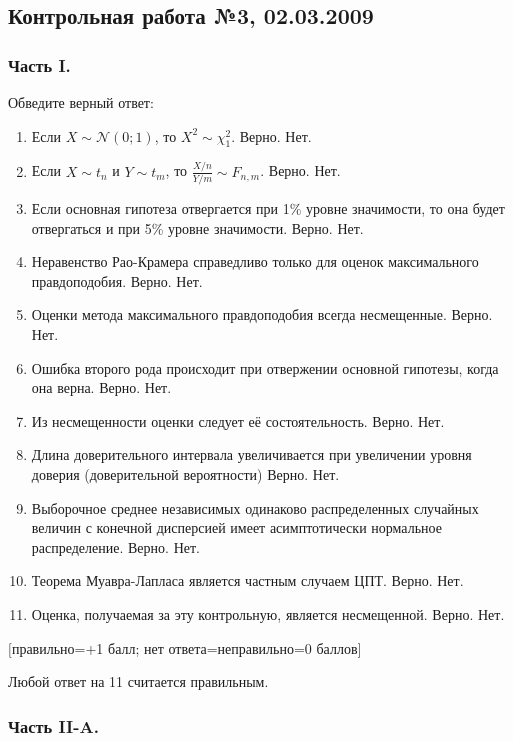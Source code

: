 \documentclass[12pt, a4paper]{article}\usepackage[]{graphicx}\usepackage[]{color}
\begin{document}
\subsection{Контрольная работа №3, 02.03.2009}

\subsubsection*{Часть I.}

Обведите верный ответ:

\begin{enumerate}
\item Если $X\sim \mathcal{N}(0;1)$, то $X^{2}\sim \chi^{2}_{1}$. Верно. Нет.
\item Если $X\sim t_{n}$ и $Y\sim t_{m}$, то $\frac{X/n}{Y/m}\sim F_{n,m}$. Верно. Нет.
\item Если основная гипотеза отвергается  при 1\% уровне значимости, то она будет отвергаться и при 5\% уровне значимости. Верно. Нет.
\item Неравенство Рао-Крамера справедливо только для оценок максимального правдоподобия. Верно. Нет.
\item Оценки метода максимального правдоподобия всегда несмещенные. Верно. Нет.
\item Ошибка второго рода происходит при отвержении основной гипотезы, когда она верна. Верно. Нет.
\item Из несмещенности оценки следует её состоятельность. Верно. Нет.
\item Длина доверительного интервала увеличивается при увеличении уровня доверия (доверительной вероятности) Верно. Нет.
\item Выборочное среднее независимых одинаково распределенных случайных величин с конечной дисперсией имеет асимптотически нормальное распределение. Верно. Нет.
\item Теорема Муавра-Лапласа  является частным случаем ЦПТ. Верно. Нет.
\item Оценка, получаемая за эту контрольную, является несмещенной. Верно. Нет.
\end{enumerate}

$[$правильно=+1 балл; нет ответа=неправильно=0 баллов$]$

Любой ответ на 11 считается правильным.

\subsubsection*{Часть II-A.}
\end{document}
